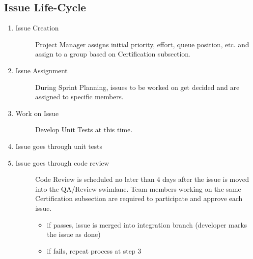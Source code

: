 \documentclass[letterpaper,10pt,english]{sphinxmanual}
\begin{document}
\subsection{Issue Life-Cycle}
\label{\detokenize{test_plan/issue_management:issue-life-cycle}}\begin{enumerate}
\def\theenumi{\arabic{enumi}}
\def\labelenumi{\theenumi .}
\makeatletter\def\p@enumii{\p@enumi \theenumi .}\makeatother
\item {} \begin{description}
\item[{Issue Creation}] \leavevmode
Project Manager assigns initial priority, effort, queue position, etc. and assign to a group based on Certification subsection.

\end{description}

\item {} \begin{description}
\item[{Issue Assignment}] \leavevmode
During Sprint Planning, issues to be worked on get decided and are assigned to specific members.

\end{description}

\item {} \begin{description}
\item[{Work on Issue}] \leavevmode
Develop Unit Tests at this time.

\end{description}

\item {} 
Issue goes through unit tests

\item {} \begin{description}
\item[{Issue goes through code review}] \leavevmode
Code Review is scheduled no later than 4 days after the issue is moved into the QA/Review swimlane. Team members working on the same Certification subsection are required to participate and approve each issue.
\begin{itemize}
\item {} 
if passes, issue is merged into integration branch (developer marks the issue as done)

\item {} 
if fails, repeat process at step 3

\end{itemize}

\end{description}

\end{enumerate}
\end{document}
